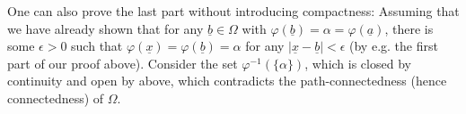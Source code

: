 One can also prove the last part without introducing compactness:
Assuming that we have already shown that for any $\underline{b}\in\Omega$ with $\varphi(\underline{b})=\alpha=\varphi(\underline{a})$, there is some $\epsilon>0$ such that $\varphi(\underline{x})=\varphi(\underline{b})=\alpha$ for any $|\underline{x}-\underline{b}|<\epsilon$ (by e.g. the first part of our proof above).
Consider the set $\varphi^{-1}(\{\alpha\})$, which is closed by continuity and open by above, which contradicts the path-connectedness (hence connectedness) of $\Omega$.